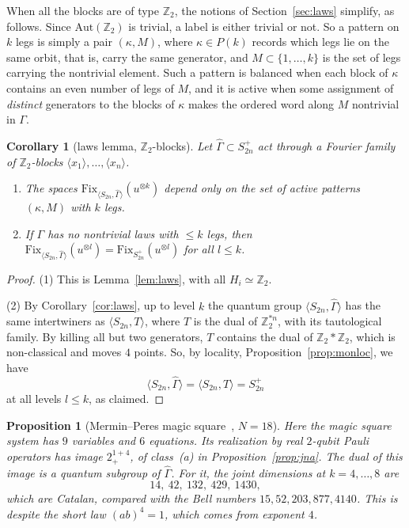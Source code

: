 \documentclass[11pt]{amsart}
\newtheorem{proposition}[theorem]{Proposition}
\newtheorem{corollary}[theorem]{Corollary}
\theoremstyle{definition}
\theoremstyle{remark}
\theoremstyle{plain}
\numberwithin{equation}{section}
\numberwithin{table}{section}
\newcommand{\Z}{\mathbb Z}
\newcommand{\Fix}{\mathrm{Fix}}
\begin{document}
When all the blocks are of type $\Z_2$, the notions of Section~\ref{sec:laws} simplify, as follows. Since $\mathrm{Aut}(\Z_2)$ is trivial, a label is either trivial or not. So a pattern on $k$ legs is simply a pair $(\kappa,M)$, where $\kappa\in P(k)$ records which legs lie on the same orbit, that is, carry the same generator, and $M\subset\{1,\dots,k\}$ is the set of legs carrying the nontrivial element. Such a pattern is balanced when each block of $\kappa$ contains an even number of legs of $M$, and it is active when some assignment of \emph{distinct} generators to the blocks of $\kappa$ makes the ordered word along $M$ nontrivial in $\Gamma$.

\begin{corollary}[laws lemma, $\Z_2$-blocks]\label{cor:z2laws}
Let $\widehat\Gamma\subset S_{2n}^+$ act through a Fourier family of $\Z_2$-blocks $\langle x_1\rangle,\dots,\langle x_n\rangle$.
\begin{enumerate}
\item The spaces $\Fix_{\langle S_{2n},\widehat\Gamma\rangle}(u^{\otimes k})$ depend only on the set of active patterns $(\kappa,M)$ with $k$ legs.
\item If $\Gamma$ has no nontrivial laws with $\le k$ legs, then $\Fix_{\langle S_{2n},\widehat\Gamma\rangle}(u^{\otimes l})=\Fix_{S_{2n}^+}(u^{\otimes l})$ for all $l\le k$.
\end{enumerate}
\end{corollary}

\begin{proof}
(1) This is Lemma~\ref{lem:laws}, with all $H_i\simeq\Z_2$.

(2) By Corollary~\ref{cor:laws}, up to level $k$ the quantum group $\langle S_{2n},\widehat\Gamma\rangle$ has the same intertwiners as $\langle S_{2n},T\rangle$, where $T$ is the dual of $\Z_2^{*n}$, with its tautological family. By killing all but two generators, $T$ contains the dual of $\Z_2*\Z_2$, which is non-classical and moves $4$ points. So, by locality, Proposition~\ref{prop:monloc}, we have
\[
\langle S_{2n},\widehat\Gamma\rangle=\langle S_{2n},T\rangle=S_{2n}^+
\]
at all levels $l\le k$, as claimed.
\end{proof}

\begin{proposition}[Mermin--Peres magic square~\cite{me}, $N=18$]\label{prop:magic}
Here the magic square system has $9$ variables and $6$ equations. Its realization by real $2$-qubit Pauli operators has image $2^{1+4}_+$, of class~(a) in Proposition~\ref{prop:jna}. The dual of this image is a quantum subgroup of $\widehat\Gamma$. For it, the joint dimensions at $k=4,\dots,8$ are
\[
14,\ 42,\ 132,\ 429,\ 1430 ,
\]
which are Catalan, compared with the Bell numbers $15,52,203,877,4140$. This is despite the short law $(ab)^4=1$, which comes from exponent $4$.
\end{proposition}
\end{document}

